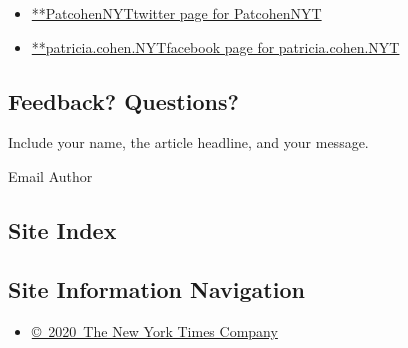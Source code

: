 \begin{itemize}
\tightlist
\item
  \href{https://twitter.com/PatcohenNYT}{**PatcohenNYTtwitter page for
  PatcohenNYT}
\item
  \href{https://www.facebookcorewwwi.onion/patricia.cohen.NYT}{**patricia.cohen.NYTfacebook
  page for patricia.cohen.NYT}
\end{itemize}

\hypertarget{feedback-questions}{%
\subsection{Feedback? Questions?}\label{feedback-questions}}

Include your name, the article headline, and your message.

Email Author

\hypertarget{site-index}{%
\subsection{Site Index}\label{site-index}}

\hypertarget{site-information-navigation}{%
\subsection{Site Information
Navigation}\label{site-information-navigation}}

\begin{itemize}
\tightlist
\item
  \href{https://help.nytimes3xbfgragh.onion/hc/en-us/articles/115014792127-Copyright-notice}{©~2020~The
  New York Times Company}
\end{itemize}

